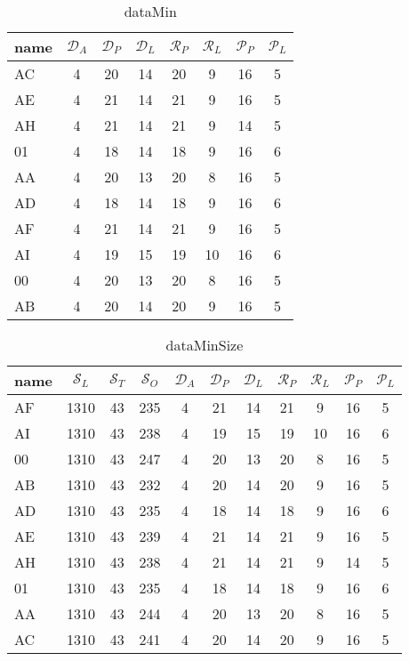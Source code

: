\documentclass{article}
\begin{document}
\begin{table}[ht]
\centering
\begin{tabular}{|l|c|c|c|c|c|c|c|}
\hline
name & $\mathcal{D}_A$ & $\mathcal{D}_P$ & $\mathcal{D}_L$ & $\mathcal{R}_P$ & $\mathcal{R}_L$ & $\mathcal{P}_P$ & $\mathcal{P}_L$ \\ \hline
AC & 4 & 20 & 14 & 20 & 9 & 16 & 5  \\ \hline
AE & 4 & 21 & 14 & 21 & 9 & 16 & 5  \\ \hline
AH & 4 & 21 & 14 & 21 & 9 & 14 & 5  \\ \hline
01 & 4 & 18 & 14 & 18 & 9 & 16 & 6  \\ \hline
AA & 4 & 20 & 13 & 20 & 8 & 16 & 5  \\ \hline
AD & 4 & 18 & 14 & 18 & 9 & 16 & 6  \\ \hline
AF & 4 & 21 & 14 & 21 & 9 & 16 & 5  \\ \hline
AI & 4 & 19 & 15 & 19 & 10 & 16 & 6  \\ \hline
00 & 4 & 20 & 13 & 20 & 8 & 16 & 5  \\ \hline
AB & 4 & 20 & 14 & 20 & 9 & 16 & 5  \\ \hline
\end{tabular}
\caption{dataMin}
\label{Tab:dataMin}
\end{table}


\begin{table}[ht]
\centering
\begin{tabular}{|l|c|c|c|c|c|c|c|c|c|c|}
\hline
name  & $\mathcal{S}_L$ & $\mathcal{S}_T$ & $\mathcal{S}_O$ & $\mathcal{D}_A$ & $\mathcal{D}_P$ & $\mathcal{D}_L$ & $\mathcal{R}_P$ & $\mathcal{R}_L$ & $\mathcal{P}_P$ & $\mathcal{P}_L$ \\ \hline
AF & 1310 & 43 & 235 & 4 & 21 & 14 & 21 & 9 & 16 & 5  \\ \hline
AI & 1310 & 43 & 238 & 4 & 19 & 15 & 19 & 10 & 16 & 6  \\ \hline
00 & 1310 & 43 & 247 & 4 & 20 & 13 & 20 & 8 & 16 & 5  \\ \hline
AB & 1310 & 43 & 232 & 4 & 20 & 14 & 20 & 9 & 16 & 5  \\ \hline
AD & 1310 & 43 & 235 & 4 & 18 & 14 & 18 & 9 & 16 & 6  \\ \hline
AE & 1310 & 43 & 239 & 4 & 21 & 14 & 21 & 9 & 16 & 5  \\ \hline
AH & 1310 & 43 & 238 & 4 & 21 & 14 & 21 & 9 & 14 & 5  \\ \hline
01 & 1310 & 43 & 235 & 4 & 18 & 14 & 18 & 9 & 16 & 6  \\ \hline
AA & 1310 & 43 & 244 & 4 & 20 & 13 & 20 & 8 & 16 & 5  \\ \hline
AC & 1310 & 43 & 241 & 4 & 20 & 14 & 20 & 9 & 16 & 5  \\ \hline
\end{tabular}
\caption{dataMinSize}
\label{Tab:dataMinSize}
\end{table}
\end{document}
